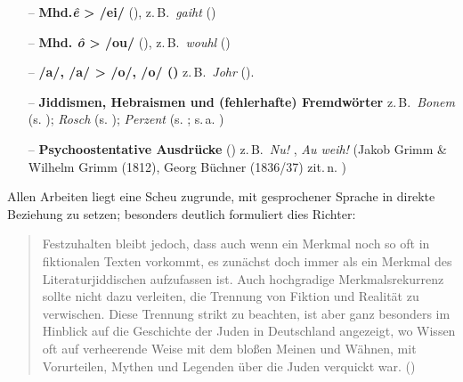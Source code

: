 \begin{itemize}
	
	\item [–] \textbf{Mhd.\textit{ê} > /ei/}  (\citealt[143]{Neubauer1994}),  z.\,B.\, \textit{gaiht}  (\citealt[143]{Neubauer1994})\label{bspform7} 
	
	\item [–] \textbf{Mhd. \textit{ô} > /ou/}   (\citealt[143]{Neubauer1994}), z.\,B.\, \textit{wouhl}  (\citealt[143]{Neubauer1994})	\label{bspform8} 

		\item [–] \textbf{/a/, /a\textlengthmark/ > /o/, /o\textlengthmark/ ()}  z.\,B.\, \textit{Johr}  (\citealt[177]{Jenzsch1974}).\label{bspform10} 

	
	\item [–] \textbf{Jiddismen, Hebraismen und (fehlerhafte) Fremdwörter} z.\,B.\, \textit{Bonem}  (s. \citealt[217]{Althaus1981}); \textit{Rosch}  (s. \citealt[217]{Althaus1981}); \textit{Perzent}  (s. \citealt[108f,\,115–122]{Richter1995}; s.\,a. \citealt[142]{Neubauer1994})\label{bspform4} 
		
	\item [–]  \textbf{Psychoostentative Ausdrücke}   (\citealt[141]{Gubser1998}) z.\,B.\, \textit{Nu!} , \textit{Au weih!}  (Jakob Grimm \& Wilhelm Grimm  (1812), Georg Büchner  (1836/37) zit.\,n. \citealt[142]{Gubser1998})\label{bspform5} 
	
\end{itemize}

Allen Arbeiten liegt eine Scheu zugrunde,  mit gesprochener Sprache in direkte Beziehung zu setzen; besonders deutlich formuliert dies Richter:

\begin{quote}
Festzuhalten bleibt jedoch, dass auch wenn ein Merkmal noch so oft in fiktionalen Texten vorkommt, es zunächst doch immer als ein Merkmal des Literaturjiddischen aufzufassen ist. Auch hochgradige Merkmalsrekurrenz sollte nicht dazu verleiten, die Trennung von Fiktion und Realität zu verwischen. Diese Trennung strikt zu beachten, ist aber ganz besonders im Hinblick auf die Geschichte der Juden in Deutschland angezeigt, wo Wissen oft auf verheerende Weise mit dem bloßen Meinen und Wähnen, mit Vorurteilen, Mythen und Legenden über die Juden verquickt war. (\citealt[99]{Richter1995})
\end{quote}

